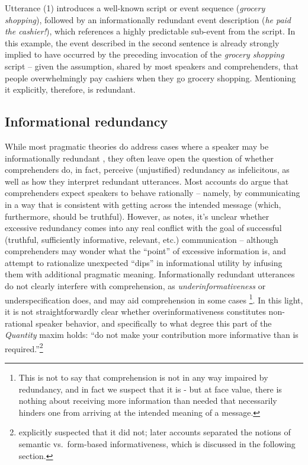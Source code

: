 Utterance (1) introduces a well-known script or event sequence
(\emph{grocery shopping}), followed by an informationally redundant
event description (\emph{he paid the cashier!}), which references a
highly predictable sub-event from the script. In this example, the event
described in the second sentence is already strongly implied to have
occurred by the preceding invocation of the \emph{grocery shopping}
script -- given the assumption, shared by most speakers and
comprehenders, that people overwhelmingly pay cashiers when they go
grocery shopping. Mentioning it explicitly, therefore, is redundant.

\subsection{Informational redundancy}\label{informational-redundancy}

While most pragmatic theories do address cases where a speaker may be
informationally redundant \citep[][,
among many others]{Grice1975, Horn1984, Levinson2000}, they often leave open the question of whether
comprehenders do, in fact, perceive (unjustified) redundancy as
infelicitous, as well as how they interpret redundant utterances. Most
accounts do argue that comprehenders expect speakers to behave
rationally -- namely, by communicating in a way that is consistent with
getting across the intended message (which, furthermore, should be
truthful). However, as \citet{Grice1975} notes, it's unclear whether
excessive redundancy comes into any real conflict with the goal of
successful (truthful, sufficiently informative, relevant, etc.)
communication -- although comprehenders may wonder what the
\enquote{point} of excessive information is, and attempt to rationalize
unexpected \enquote{dips} in informational utility by infusing them with
additional pragmatic meaning. Informationally redundant utterances do
not clearly interfere with comprehension, as \emph{underinformativeness}
or underspecification does, and may aid comprehension in some cases
\citep[e.g., object identification; cf.][]{Nadig2002,
RubioFernandez2016}\footnote{This is not to say that comprehension is
  not in any way impaired by redundancy, and in fact we suspect that it
  is - but at face value, there is nothing about receiving more
  information than needed that necessarily hinders one from arriving at
  the intended meaning of a message.}. In this light, it is not
straightforwardly clear whether overinformativeness constitutes
non-rational speaker behavior, and specifically to what degree this part
of the \emph{Quantity} maxim holds: \enquote{do not make your
contribution more informative than is required.}\footnote{\citet{Grice1975}
  explicitly suspected that it did not; later accounts separated the
  notions of semantic vs.~form-based informativeness, which is discussed
  in the following section.}

